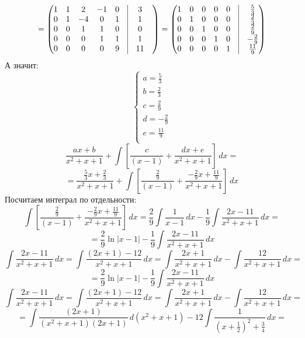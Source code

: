 \documentclass[a4paper,12pt]{article}
\begin{document}
\[
=
\begin{pmatrix}
1 & 1 & 2 & -1 & 0 & \vrule &3 & \\
0 & 1 & -4 & 0 & 1 & \vrule &1 & \\
0 & 0 & 1 & 1 & 0 & \vrule &0 & \\
0 & 0 & 0 & 1 & 1 & \vrule &1 & \\
0 & 0 & 0 & 0 & 9 & \vrule &11 & \\
\end{pmatrix}
=
\begin{pmatrix}
1 & 0 & 0 & 0 & 0 & \vrule &\frac{5}{3} \\
0 & 1 & 0& 0 & 0& \vrule &\frac{2}{3} \\
0 & 0 & 1 & 0 & 0 & \vrule &\frac{2}{9} \\
0 & 0 & 0 & 1 & 0 & \vrule &-\frac{2}{9} \\
0 & 0 & 0 & 0 & 1& \vrule &\frac{11}{9} \\
\end{pmatrix}
\]
А значит:
\[
\begin{cases}
a = \frac{5}{3}\\
b = \frac{2}{3} \\
c = \frac{2}{9} \\
d =  -\frac{2}{9} \\
e = \frac{11}{9} \\
\end{cases}
\]
\[
 \frac{ax+b}{x^2+x+1} + \int  \left[ \frac{c}{(x-1)}  + \frac{dx + e}{x^2+x+1} \right] \,dx = 
\]
\[
= 
 \frac{\frac{5}{3}x+\frac{2}{3}}{x^2+x+1} + \int  \left[ \frac{ \frac{2}{9}}{(x-1)}  + \frac{-\frac{2}{9}x + \frac{11}{9}}{x^2+x+1} \right] \,dx
\]
Посчитаем интеграл по отдельности:
\[
\int  \left[ \frac{ \frac{2}{9}}{(x-1)}  + \frac{-\frac{2}{9}x + \frac{11}{9}}{x^2+x+1} \right] \,dx = \frac{2}{9} \int \frac{1}{x-1} \, dx  - \frac{1}{9} \int \frac{2x-11}{x^2 +x + 1} \, dx  = 
\]
\[
= \frac{2}{9} \ln|x-1| - \frac{1}{9}\int \frac{2x - 11}{x^2 +x + 1} \, dx
\]
\[
\int \frac{2x - 11}{x^2 + x + 1} \, dx = \int \frac{(2x+1) - 12 }{x^2 + x + 1} \, dx  = \int \frac{2x+1}{x^2 + x + 1} \, dx  - \int \frac{12}{x^2 + x +1} \, dx =
\]
\[
=
\frac{2}{9} \ln |x-1| - \frac{1}{9} \int \frac{2x-11}{x^2+x+1} \, dx
\]
\[
\int \frac{2x-11}{x^2 + x +1} \, dx = \int \frac{(2x+1) - 12}{x^2 + x + 1} \, dx = \int \frac{2x+1}{x^2 + x + 1} \, dx - \int \frac{12}{x^2 + x + 1} \, dx = 
\]
\[
=
\int \frac{(2x+1)}{(x^2+x+1)(2x+1)} \, d(x^2 + x + 1) -12 \int \frac{1}{(x + \frac{1}{2})^2 + \frac{3}{4}} \, dx = 
\]
\end{document}
